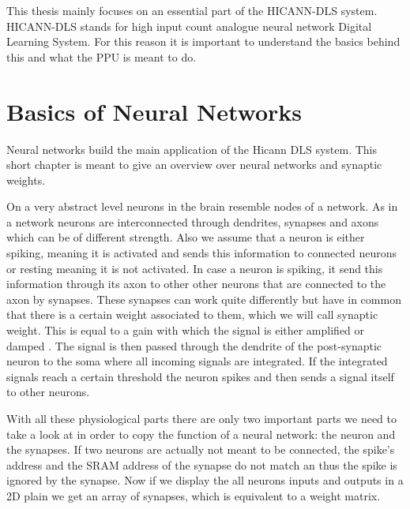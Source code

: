 
This thesis mainly focuses on an essential part of the HICANN-DLS system.
HICANN-DLS stands for high input count analogue neural network Digital Learning System.
For this reason it is important to understand the basics behind this and what the PPU is meant to do.

\section{Basics of Neural Networks}
Neural networks build the main application of the Hicann DLS system. This short chapter is meant to give an overview over neural networks and synaptic weights.

On a very abstract level neurons in the brain resemble nodes of a network.
As in a network neurons are interconnected through dendrites, synapses and axons which can be of different strength. 
Also we assume that a neuron is either spiking, meaning it is activated and sends this information to connected neurons or resting meaning it is not activated.
In case a neuron is spiking, it send this information through its axon to other other neurons that are connected to the axon by synapses.
These synapses can work quite differently but have in common that there is a certain weight associated to them, which we will call synaptic weight.
This is equal to a gain with which the signal is either amplified or damped .
The signal is then passed through the dendrite of the post-synaptic neuron to the soma where all incoming signals are integrated.
If the integrated signals reach a certain threshold the neuron spikes and then sends a signal itself to other neurons.

With all these physiological parts there are only two important parts we need to take a look at in order to copy the function of a neural network: the neuron and the synapses.
If two neurons are actually not meant to be connected, the spike's address and the SRAM address of the synapse do not match an thus the spike is ignored by the synapse.
Now if we display the all neurons inputs and outputs in a 2D plain we get an array of synapses, which is equivalent to a weight matrix.

